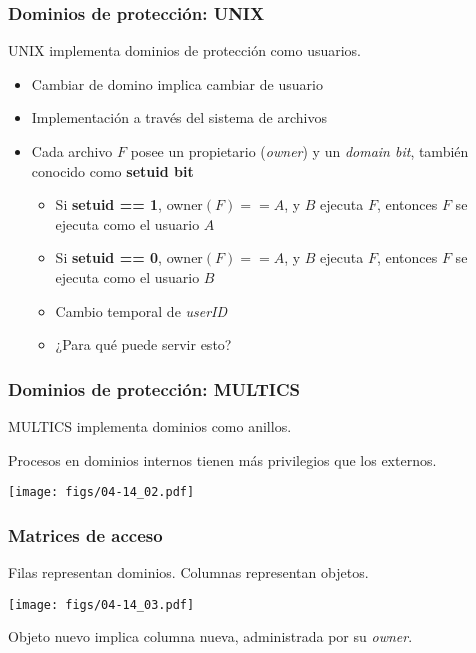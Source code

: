 \documentclass[letter]{beamer}
\begin{document}
\begin{frame}
  \frametitle{Dominios de protección: UNIX}

  UNIX implementa dominios de protección como usuarios.
  \begin{itemize}
    \item Cambiar de domino implica cambiar de usuario
    \item Implementación a través del sistema de archivos
    \item Cada archivo $F$ posee un propietario ({\em owner}) y un {\em domain bit}, 
          también conocido como {\bf setuid bit}
      \begin{itemize}
        \item Si {\bf setuid == 1}, owner$(F)==A$, y $B$ ejecuta $F$, entonces $F$ se ejecuta como el usuario $A$
        \item Si {\bf setuid == 0}, owner$(F)==A$, y $B$ ejecuta $F$, entonces $F$ se ejecuta como el usuario $B$
        \item Cambio temporal de {\em userID}
        \item ¿Para qué puede servir esto?
      \end{itemize}
  \end{itemize}
\end{frame}

\begin{frame}
  \frametitle{Dominios de protección: MULTICS}

  MULTICS implementa dominios como anillos.

  Procesos en dominios internos tienen más privilegios que los externos.

  \begin{center}
    \texttt{[image: figs/04-14\_02.pdf]}
  \end{center}

\end{frame}

\begin{frame}
  \frametitle{Matrices de acceso}

  Filas representan dominios. Columnas representan objetos.


  \begin{center}
    \texttt{[image: figs/04-14\_03.pdf]}
  \end{center}

  Objeto nuevo implica columna nueva, administrada por su {\em owner}.
  
  
\end{frame}
\end{document}
